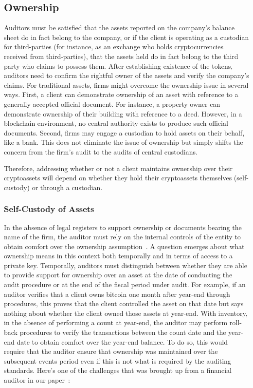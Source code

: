 

\subsection{Ownership}\label{sec:auditing:framework:ownership}

Auditors must be satisfied that the assets reported on the company's balance sheet do in fact belong to the company, or if the client is operating as a custodian for third-parties (for instance, as an exchange who holds cryptocurrencies received from third-parties), that the assets held do in fact belong to the third party who claims to possess them. After establishing existence of the tokens, auditors need to confirm the rightful owner of the assets and verify the company's claims. For traditional assets, firms might overcome the ownership issue in several ways. First, a client can demonstrate ownership of an asset with reference to a generally accepted official document. For instance, a property owner can demonstrate ownership of their building with reference to a deed. However, in a blockchain environment, no central authority exists to produce such official documents. Second, firms may engage a custodian to hold assets on their behalf, like a bank. This does not eliminate the issue of ownership but simply shifts the concern from the firm's audit to the audits of central custodians.

Therefore, addressing whether or not a client maintains ownership over their cryptoassets will depend on whether they hold their cryptoassets themselves (self-custody) or through a custodian. 

\subsubsection{Self-Custody of Assets}
In the absence of legal registers to support ownership or documents bearing the name of the firm, the auditor must rely on the internal controls of the entity to obtain comfort over the ownership assumption~\cite{pimentel2021systemizing}. A question emerges about what ownership means in this context both temporally and in terms of access to a private key. Temporally, auditors must distinguish between whether they are able to provide support for ownership over an asset at the date of conducting the audit procedure or at the end of the fiscal period under audit. For example, if an auditor verifies that a client owns bitcoin one month after year-end through procedures, this proves that the client controlled the asset on that date but says nothing about whether the client owned those assets at year-end. With inventory, in the absence of performing a count at year-end, the auditor may perform roll-back procedures to verify the transactions between the count date and the year-end date to obtain comfort over the year-end balance. To do so, this would require that the auditor ensure that ownership was maintained over the subsequent events period even if this is not what is required by the auditing standards. Here's one of the challenges that was brought up from a financial auditor in our paper~\cite{pimentel2021systemizing}:


